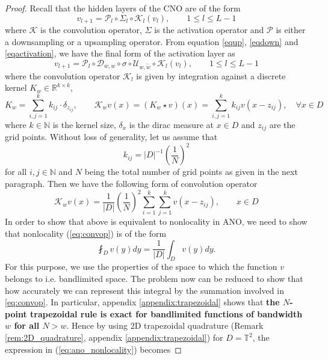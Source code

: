 \documentclass[reqno,10pt]{amsart}
\theoremstyle{plain}
\theoremstyle{definition}
\newcommand{\bb}[1]{\mathbb{#1}}
\newcommand{\cal}[1]{\mathcal{#1}}
\begin{document}
    \begin{proof}
        Recall that the hidden layers of the CNO are of the form
        \begin{equation}
            v_{l+1} = \cal P_l \circ \Sigma_l \circ \cal K_l(v_l), \qquad 1 \leq l \leq L-1
        \end{equation}
        where $\cal K$ is the convolution operator, $\Sigma$ is the activation operator and $\cal P$ is either a downsampling or a upsampling operator. From equation \ref{equp}, \ref{eqdown} and \ref{eqactivation}, we have the final form of the activation layer as 
        \begin{equation}\label{eq:cno_activation}
            v_{l+1} = \cal P_l \circ \cal D_{\overline{w},w} \circ \sigma \circ \cal U_{w,\tilde{w}} \circ \cal K_l(v_l), \qquad 1 \leq l \leq L-1
        \end{equation}
        where the convolution operator $\cal K_l$ is given by integration against a discrete kernel $K_w \in \bb R^{k \times k}$, 
        $$  K_w = \sum_{i,j = 1}^{k} k_{ij} \cdot \delta_{z_{ij}}, \qquad \cal K_wv(x) = (K_w \star v)(x) = \sum_{i,j=1}^{k}k_{ij}v(x-z_{ij}), \quad\forall x \in D$$
        where $k \in \bb N$ is the kernel size, $\delta_x$ is the dirac measure at $x \in D$ and $z_{ij}$ are the grid points. Without loss of generality, let us assume that
        \begin{equation}\label{eq:kernel_cno}
            k_{ij}= |D|^{-1}\left(\frac{1}{N}\right)^2
        \end{equation}
        for all $i,j \in \bb N$ and $N$ being the total number of grid points as given in the next paragraph. Then we have the following form of convolution operator
        \begin{equation}\label{eq:convop}
            \cal K_wv(x) = \frac{1}{|D|}\left(\frac{1}{N}\right)^2 \sum_{i=1}^{k} \sum_{j=1}^{k} v(x-z_{ij}), \qquad x \in D
        \end{equation}
        In order to show that above is equivalent to nonlocality in ANO, we need to show that nonlocality (\ref{eq:convop}) is of the form
        \begin{equation}\label{eq:ano_nonlocality}
            \fint_D v(y)dy = \frac{1}{|D|} \int_D v(y)dy.
        \end{equation}
        For this purpose, we use the properties of the space to which the function $v$ belongs to i.e. bandlimited space. The problem now can be reduced to show that how accurately we can represent this integral by the summation involved in \ref{eq:convop}. In particular, appendix \ref{appendix:trapezoidal} shows that {\bf the $N$-point trapezoidal rule is exact for bandlimited functions of bandwidth $w$ for all $N > w$}. Hence by using 2D trapezoidal quadrature (Remark \ref{rem:2D_quadrature}, appendix \ref{appendix:trapezoidal}) for $D = \bb T^2$, the expression in (\ref{eq:ano_nonlocality}) becomes

\end{proof}
\end{document}
